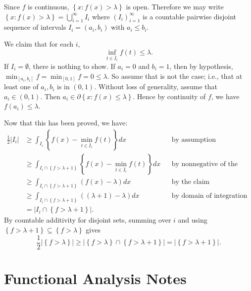 \documentclass[answers]{exam}
\begin{document}
\begin{questions}
\begin{solution}
  Since $f$ is continuous, $\left\{x: f(x)>\lambda \right\}$ is open. Therefore we may write $\left\{x: f(x)>\lambda \right\} = \bigcup_{i=1}^{\infty}I_{i}$ where $(I_{i})_{i=1}^{\infty}$ is a countable pairwise disjoint sequence of intervals $I_{i}=(a_{i},b_{i})$ with $a_{i}\leq b_{i}$.

  We claim that for each $i$,
  \[ \inf_{t \in \overline{I}_i} f(t) \leq \lambda. \]
  If $I_i = \emptyset$, there is nothing to show. If $a_i = 0$ and $b_i = 1$, then by hypothesis, $\min_{[a_{i},b_{i}]}f =\min_{[0,1]}f = 0\leq \lambda$. So assume that is not the case; i.e., that at least one of $a_{i},b_{i}$ is in $(0,1)$. Without loss of generality, assume that $a_i \in (0,1)$. Then $a_i \in \partial \left\{ x: f(x)\leq \lambda \right\}$. Hence by continuity of $f$, we have $f(a_{i})\leq \lambda$.

  Now that this has been proved, we have:
  \begin{align*}
    \frac{1}{2}|I_{i}| &\geq \int_{I_{i}} \left\{ f(x)-\min_{t\in {\bar{I}_{i}}}f(t) \right\} dx
    &&\text{by assumption}\\
                       &\geq\int_{I_{i}\cap \left\{ f > \lambda+1 \right\}} \left\{ f(x)-\min_{t\in{\bar{I}_{i}}}f(t) \right\} dx
    &&\text{by nonnegative of the integrand}\\
                       &\geq \int_{I_{i}\cap \left\{ f > \lambda+1 \right\}} (f(x)-\lambda) dx
    &&\text{by the claim}\\
                       &\geq \int_{I_{i}\cap \left\{ f > \lambda+1 \right\}} ((\lambda+1)-\lambda) dx
    &&\text{by domain of integration}\\
                       &= \left|I_{i} \cap \left\{  f> \lambda+1\right\} \right|.
  \end{align*}
  By countable additivity for disjoint sets, summing over $i$ and using $\left\{f>\lambda+1 \right\}\subseteq
 \left\{f>\lambda \right\}$ gives
  \begin{equation*}
    \frac{1}{2}\left| \left\{f >\lambda \right\} \right|  \geq \left| \left\{ f>\lambda \right\}\cap \left\{ f>\lambda+1 \right\} \right| = \left| \left\{ f>\lambda+1 \right\} \right|.
  \end{equation*}
\end{solution}




\newpage
\section{Functional Analysis Notes}


\end{questions}
\end{document}
